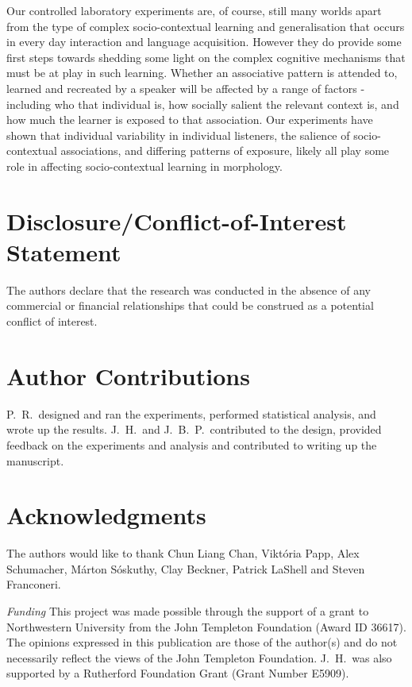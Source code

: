 \documentclass{frontiersSCNS} %
\begin{document}
Our controlled laboratory experiments are, of course, still many worlds apart from the type of complex socio-contextual learning and generalisation that occurs in every day interaction and language acquisition.    However they do provide some first steps towards shedding some light on the complex cognitive mechanisms that must be  at play in such learning.  Whether an associative pattern is attended to, learned and recreated by a speaker will be affected by a range of factors - including who that individual is, how socially salient the relevant context is, and how much the learner is exposed to that association.   Our experiments have shown that individual variability in individual listeners, the salience of socio-contextual associations, and differing patterns of exposure, likely all play some role in affecting socio-contextual learning in morphology.

\section*{Disclosure/Conflict-of-Interest Statement}

The authors declare that the research was conducted in the absence of any commercial or financial relationships that could be construed as a potential conflict of interest.

\section*{Author Contributions}

P.\ R.\ designed and ran the experiments, performed statistical analysis, and wrote up the results. J.\ H.\ and J.\ B.\ P.\ 
contributed to the design, provided feedback on the experiments and analysis and contributed to
writing up the manuscript.

\section*{Acknowledgments}

The authors would like to thank Chun Liang Chan, Vikt\'oria Papp, Alex Schumacher, M\'arton S\'oskuthy, Clay Beckner, Patrick LaShell and Steven Franconeri.

\textit{Funding\textcolon} This project was made possible through the support of a grant to Northwestern University from the John Templeton Foundation (Award ID 36617). The opinions expressed in this publication are those of the author(s) and do not necessarily reflect the views of the John Templeton Foundation. J.\ H.\ was also supported by a Rutherford Foundation Grant (Grant Number E5909).
\end{document}
